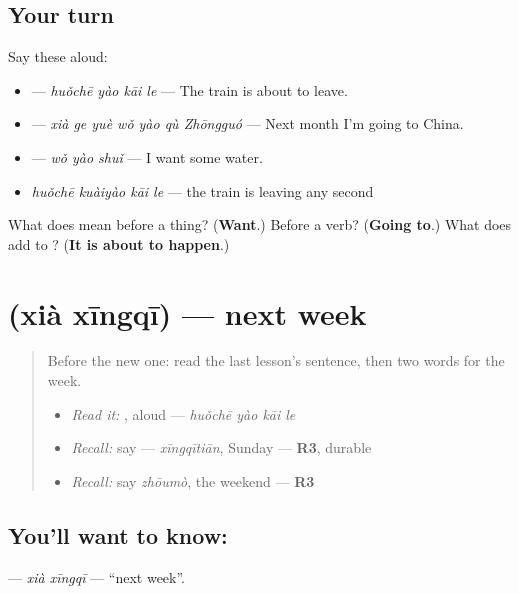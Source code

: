 \subsection*{Your turn}
Say these aloud:

\begin{itemize}
\raggedright
  \item {} — \emph{huǒchē yào kāi le} — The train is about to leave.
  \item {} — \emph{xià ge yuè wǒ yào qù Zhōngguó} — Next month I'm going to China.
  \item {} — \emph{wǒ yào shuǐ} — I want some water.
  \item \emph{huǒchē kuàiyào kāi le} — the train is leaving any second
\end{itemize}

\begin{tcolorbox}[breakable,colback=teal!4,colframe=teal!35!black,title={Before you move on}]
What does  mean before a thing? (\textbf{Want}.) Before a verb? (\textbf{Going to}.) What does  add to ? (\textbf{It is about to happen}.)
\end{tcolorbox}
\section[\texorpdfstring{\zh{下星期} (xià xīngqī)}{下星期 (xià xīngqī)}]{ (xià xīngqī) — next week}

\label{lesson:ZH-C148-xia-xingqi}



\begin{quote}
Before the new one: read the last lesson's sentence, then two words for the week.

\begin{itemize}
\raggedright
  \item \emph{Read it:} , aloud — \emph{huǒchē yào kāi le}
  \item \emph{Recall:} say  — \emph{xīngqītiān}, Sunday — \textbf{R3}, durable
  \item \emph{Recall:} say \emph{zhōumò}, the weekend — \textbf{R3}
\end{itemize}
\end{quote}

\subsection*{You'll want to know: }
\textbf{} — \emph{xià xīngqī} — \textquotedblleft{}next week\textquotedblright{}.

